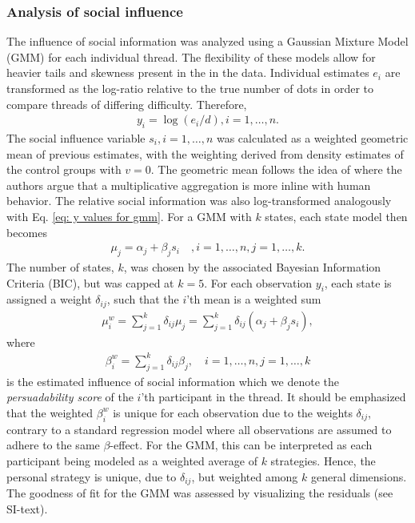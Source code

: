\documentclass[9pt,a4paper,twocolumn,lineno]{article}
\begin{document}
\subsubsection*{Analysis of social influence}
The influence of social information was analyzed using a Gaussian Mixture Model (GMM) for each individual thread. The flexibility of these models allow for heavier tails and skewness present in the in the data. Individual estimates $e_i$ are transformed as the log-ratio relative to the true number of dots in order to compare threads of differing difficulty. Therefore, 
\begin{align}
	y_i = \log(e_i/d), i=1,\dots,n. \label{eq: y values for gmm}
\end{align}
The social influence variable $s_i, i=1,\dots, n$ was calculated as a weighted geometric mean of previous estimates, with the weighting derived from density estimates of the control groups with $v=0$. The geometric mean follows the idea of \citep{jayles2017social} where the authors argue that a multiplicative aggregation is more inline with human behavior. The relative social information was also log-transformed analogously with Eq. \ref{eq: y values for gmm}.  For a GMM with $k$ states, each state model then becomes
\begin{align}
	\mu_j = \alpha_j+\beta_j s_i \quad, i=1,\dots,n, j=1, \dots,k. \label{eq: mean models}
\end{align}
The number of states, $k$, was chosen by the associated Bayesian Information Criteria (BIC), but was capped at $k=5$. For each observation $y_i$, each state is assigned a weight $\delta_{ij}$, such that the $i$'th mean is a weighted sum
\begin{align}
	\mu^w_i = \sum_{j=1}^k\delta_{ij}\mu_j = \sum_{j=1}^k\delta_{ij}(\alpha_j +\beta_j s_i),
\end{align}
where 
\begin{align}
	\beta^w_i = \sum_{j=1}^k \delta_{ij}\beta_j, \quad i=1,\dots, n, j=1,\dots,k \label{eq: weighted beta}
\end{align}
is the estimated influence of social information which we denote the \emph{persuadability score} of the $i$'th participant in the thread. It should be emphasized that the weighted $\beta^w_i$ is unique for each observation due to the weights $\delta_{ij}$, contrary to a standard regression model where all observations are assumed to adhere to the same $\beta$-effect. For the GMM, this can be interpreted as each participant being modeled as a weighted average of $k$ strategies. Hence, the personal strategy is unique, due to $\delta_{ij}$, but weighted among $k$ general dimensions. The goodness of fit for the GMM was assessed by visualizing the residuals (see SI-text). 
\end{document}
